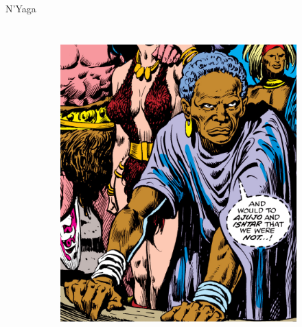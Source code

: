 \begin{frame}{N'Yaga}
\begin{columns}
\begin{figure}[htp]
\begin{subfigure}[b]{0.32\textwidth}
				\includegraphics[width=\textwidth]{img/nyaga/CTB}
			\end{subfigure}
		\end{figure}
	\end{columns}
\end{frame}
\note[itemize]{
	\item
}

